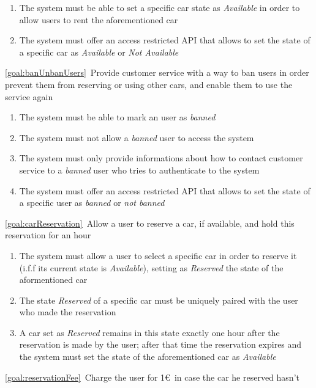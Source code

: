 \begin{description}
			\begin{enumerate}[resume*]
   				\item The system must be able to set a specific car state as \textit{Available} in order to
   				allow users to rent the aforementioned car
   				\item The system must offer an access restricted API that allows to set the state of a
   				specific car as \textit{Available} or \textit{Not Available}
  			\end{enumerate}
  		\item \ref{goal:banUnbanUsers}\ Provide customer service with a way to ban users in order
  		prevent them from reserving or using other cars, and enable them to use the service again
  			\begin{enumerate}[resume*]
  				\item The system must be able to mark an user as \textit{banned}
  				\item The system must not allow a \textit{banned} user to access the system
   				\item The system must only provide informations about how to contact customer service
   				to a \textit{banned} user who tries to authenticate to the system
   				\item The system must offer an access restricted API that allows to set the state of a
   				specific user as \textit{banned} or \textit{not banned}
   			\end{enumerate}
 	  	\item \ref{goal:carReservation}\ Allow a user to reserve a car, if available, and hold this
 	  	reservation for an hour
 	  		\begin{enumerate}[resume*]
 	  			\item The system must allow a user to select a specific car in order to reserve it 
 	  			(i.f.f its current state is \textit{Available}), setting as \textit{Reserved} the state of the
 	  			aformentioned car
 	  			\item The state \textit{Reserved} of a specific car must be uniquely paired with the user
 	  			who made the reservation
 	  			\item A car set as \textit{Reserved} remains in this state exactly one hour after the
 	  			reservation is made by the user; after that time the reservation expires and the system
 	  			must set the state of the aforementioned car as \textit{Available}
   			\end{enumerate}
  		\item \ref{goal:reservationFee}\ Charge the user for 1\euro\ in case the car he reserved hasn't

\end{description}
